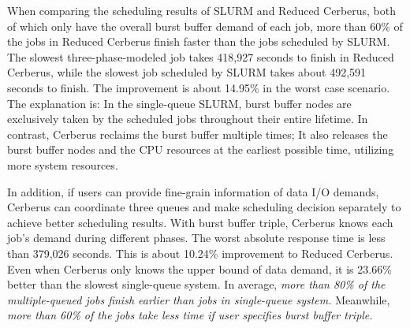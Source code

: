When comparing the scheduling results of SLURM and Reduced Cerberus,
both of which only have the overall burst buffer demand of each job,
more than 60\% of the jobs in Reduced Cerberus finish faster than the jobs scheduled by
SLURM.
The slowest three-phase-modeled job takes 418,927 seconds to finish in Reduced Cerberus,
while the slowest job scheduled by SLURM takes about 492,591 seconds to finish.
The improvement is about 14.95\% in the worst case scenario.
The explanation is: In the single-queue SLURM, burst buffer nodes
are exclusively taken by the scheduled jobs throughout their entire lifetime.
In contrast, Cerberus reclaims the burst buffer multiple times;
It also releases the burst buffer nodes and the CPU resources at the earliest possible time, 
utilizing more system resources.

In addition, if users can provide fine-grain information of data I/O demands,
Cerberus can coordinate three queues and make scheduling decision separately to achieve better scheduling results.
With burst buffer triple, Cerberus knows each job's demand during different phases.
The worst absolute response time is less than 379,026 seconds.
This is about 10.24\% improvement to Reduced Cerberus.
Even when Cerberus only knows the upper bound of data demand,
it is 23.66\% better than the slowest single-queue system.
In average, \textit{more than 80\% of the multiple-queued jobs
finish earlier than jobs in single-queue system.}
Meanwhile, \textit{more than 60\% of the jobs take less time if user
specifies burst buffer triple.}

